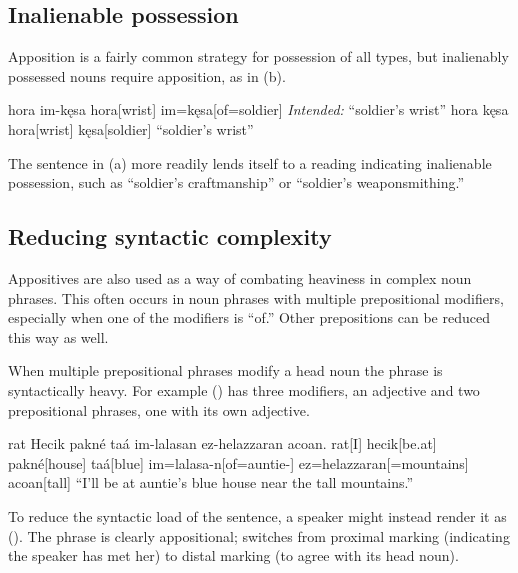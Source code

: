 \subsection{Inalienable possession}
Apposition is a fairly common strategy for possession of all types, but inalienably possessed nouns require apposition, as in (\nextx b).

\begin{gloss}
    \a {} \begingl 
        \glpreamble  hora im-kęsa \endpreamble
        hora[wrist]
        im=kęsa[of=soldier]
        \glft \textit{Intended:} “soldier's wrist”
    \endgl
    \a \begingl 
        \glpreamble hora kęsa \endpreamble
        hora[wrist]
        kęsa[soldier]
        \glft “soldier's wrist”
    \endgl
\end{gloss}

The sentence in (\lastx a) more readily lends itself to a reading indicating inalienable possession, such as “soldier's craftmanship” or “soldier's weaponsmithing.”

\subsection{Reducing syntactic complexity}
Appositives are also used as a way of combating heaviness in complex noun phrases. This often occurs in noun phrases with multiple prepositional modifiers, especially when one of the modifiers is  “of.” Other prepositions can be reduced this way as well. 

When multiple prepositional phrases modify a head noun the phrase is syntactically heavy. For example (\nextx) has three modifiers, an adjective and two prepositional phrases, one with its own adjective.

\begin{gloss*}
    \begingl
        \glpreamble rat Hecik pakné taá im-lalasan ez-helazzaran acoan. \endpreamble
        rat[I]
        hecik[be.at]
        pakné[house\tbs{}]
        taá[blue\tbs{}]
        im=lalasa-n[of=auntie-]
        ez=helazzaran[=mountains]
        acoan[tall]
        \glft “I'll be at auntie's blue house near the tall mountains.”
    \endgl
\end{gloss*}

To reduce the syntactic load of the sentence, a speaker might instead render it as (\nextx). The phrase is clearly appositional;  switches from proximal marking (indicating the speaker has met her) to distal marking (to agree with its head noun). 

